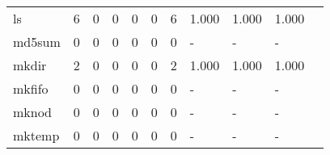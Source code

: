 \begin{longtable}{lp{1.2cm}p{1.2cm}p{1.2cm}p{1.2cm}p{1.2cm}p{1.2cm}p{1.2cm}p{1.2cm}p{1.2cm}p{1.2cm}}
ls        &                                     6 &                                                  0 &                                                  0 &                                                  0 &                                                  0 &                                                  6 &                                              1.000 &                                              1.000 &                                              1.000 \\
md5sum    &                                     0 &                                                  0 &                                                  0 &                                                  0 &                                                  0 &                                                  0 &                                                  - &                                                  - &                                                  - \\
mkdir     &                                     2 &                                                  0 &                                                  0 &                                                  0 &                                                  0 &                                                  2 &                                              1.000 &                                              1.000 &                                              1.000 \\
mkfifo    &                                     0 &                                                  0 &                                                  0 &                                                  0 &                                                  0 &                                                  0 &                                                  - &                                                  - &                                                  - \\
mknod     &                                     0 &                                                  0 &                                                  0 &                                                  0 &                                                  0 &                                                  0 &                                                  - &                                                  - &                                                  - \\
mktemp    &                                     0 &                                                  0 &                                                  0 &                                                  0 &                                                  0 &                                                  0 &                                                  - &                                                  - &                                                  - \\

\end{longtable}
